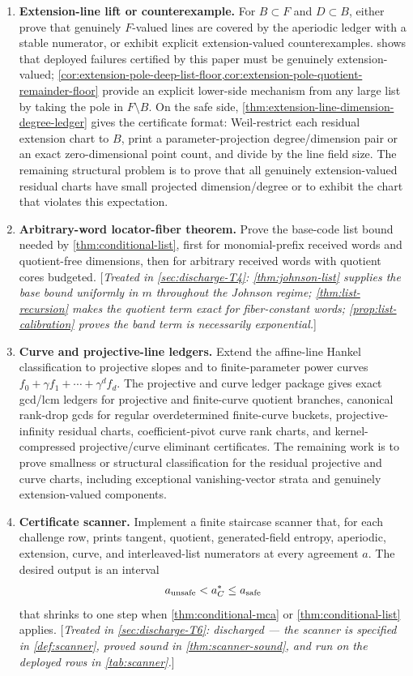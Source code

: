 \documentclass[11pt]{article}
\theoremstyle{definition}
\theoremstyle{remark}
\begin{document}
\begin{enumerate}[label=\textbf{T\arabic*.},leftmargin=2.5em]
\item \textbf{Extension-line lift or counterexample.}  For $B\subset F$ and
$D\subset B$, either prove that genuinely $F$-valued lines are covered by the
aperiodic ledger with a stable numerator, or exhibit explicit extension-valued
counterexamples.   shows that deployed failures certified by
this paper must be genuinely extension-valued; \cref{cor:extension-pole-deep-list-floor,cor:extension-pole-quotient-remainder-floor}
provide an explicit lower-side mechanism from any large list by taking the pole
in $F\setminus B$.  On the safe side,
\cref{thm:extension-line-dimension-degree-ledger} gives the certificate format:
Weil-restrict each residual extension chart to $B$, print a parameter-projection
degree/dimension pair or an exact zero-dimensional point count, and divide by the
line field size.  The remaining structural problem is to prove that all genuinely
extension-valued residual charts have small projected dimension/degree or to
exhibit the chart that violates this expectation.

\item \textbf{Arbitrary-word locator-fiber theorem.}  Prove the base-code list
bound needed by \cref{thm:conditional-list}, first for monomial-prefix received
words and quotient-free dimensions, then for arbitrary received words with
quotient cores budgeted. [\emph{Treated in \cref{sec:discharge-T4}: \cref{thm:johnson-list} supplies the base bound uniformly in $m$ throughout the Johnson regime; \cref{thm:list-recursion} makes the quotient term exact for fiber-constant words; \cref{prop:list-calibration} proves the band term is necessarily exponential.}]

\item \textbf{Curve and projective-line ledgers.}  Extend the affine-line Hankel
classification to projective slopes and to finite-parameter power curves
$f_0+\gamma f_1+\cdots+\gamma^d f_d$.  The projective and curve ledger package gives exact gcd/lcm ledgers
for projective and finite-curve quotient branches, canonical rank-drop gcds for
regular overdetermined finite-curve buckets, projective-infinity residual charts,
coefficient-pivot curve rank charts, and kernel-compressed projective/curve
eliminant certificates.  The remaining work is to prove smallness or structural
classification for the residual projective and curve charts, including
exceptional vanishing-vector strata and genuinely extension-valued components.

\item \textbf{Certificate scanner.}  Implement a finite staircase scanner that,
for each challenge row, prints tangent, quotient, generated-field entropy,
aperiodic, extension, curve, and interleaved-list numerators at every agreement
$a$.  The desired output is an interval
\[
        a_{\rm unsafe}<a_C^*\le a_{\rm safe}
\]
that shrinks to one step when \cref{thm:conditional-mca} or
\cref{thm:conditional-list} applies. [\emph{Treated in \cref{sec:discharge-T6}: discharged --- the scanner is specified in \cref{def:scanner}, proved sound in \cref{thm:scanner-sound}, and run on the deployed rows in \cref{tab:scanner}.}]


\end{enumerate}
\end{document}
